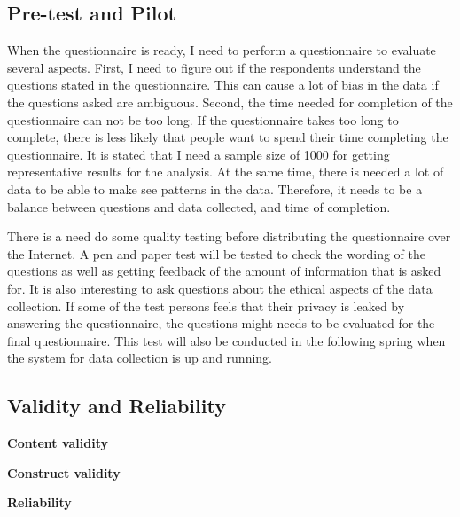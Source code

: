   \subsection{Pre-test and Pilot}
    When the questionnaire is ready, I need to perform a questionnaire to evaluate several aspects. First, I need to figure out if the respondents understand the questions stated in the questionnaire. This can cause a lot of bias in the data if the questions asked are ambiguous. Second, the time needed for completion of the questionnaire can not be too long. If the questionnaire takes too long to complete, there is less likely that people want to spend their time completing the questionnaire. It is stated that I need a sample size of 1000 for getting representative results for the analysis. At the same time, there is needed a lot of data to be able to make see patterns in the data. Therefore, it needs to be a balance between questions and data collected, and time of completion. 


    There is a need do some quality testing before distributing the questionnaire over the Internet. A pen and paper test will be tested to check the wording of the questions as well as getting feedback of the amount of information that is asked for. It is also interesting to ask questions about the ethical aspects of the data collection. If some of the test persons feels that their privacy is leaked by answering the questionnaire, the questions might needs to be evaluated for the final questionnaire. 
    This test will also be conducted in the following spring when the system for data collection is up and running. 


  \subsection{Validity and Reliability}

    {\bf Content validity}

    {\bf Construct validity}

    {\bf Reliability}





